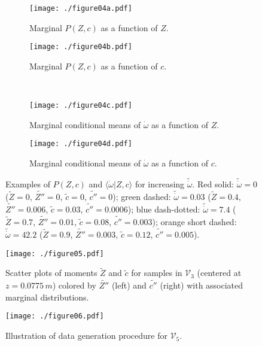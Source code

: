 \documentclass[review]{elsarticle}
\newcommand{\wt}[1]{\widetilde{#1}}
\begin{document}
\clearpage\newpage
\begin{figure}[!tbp]%
  \centering%
  \begin{subfigure}[t]{0.48\textwidth}%
    \texttt{[image: ./figure04a.pdf]}%
    \caption{Marginal $P(Z,c)$ as a function of $Z$.}%
  \end{subfigure}\hfill%
  \begin{subfigure}[t]{0.48\textwidth}%
    \texttt{[image: ./figure04b.pdf]}%
    \caption{Marginal $P(Z,c)$ as a function of $c$.}%
  \end{subfigure}\\%
  \begin{subfigure}[t]{0.48\textwidth}%
    \texttt{[image: ./figure04c.pdf]}%
    \caption{Marginal conditional means of $\dot{\omega}$ as a function of $Z$.}%
  \end{subfigure}\hfill%
  \begin{subfigure}[t]{0.48\textwidth}%
    \texttt{[image: ./figure04d.pdf]}%
    \caption{Marginal conditional means of $\dot{\omega}$ as a function of $c$.}%
  \end{subfigure}%
  \caption{Examples of $P(Z,c)$ and $\langle \dot{\omega} | Z, c \rangle$ for increasing $\wt{\dot{\omega}}$. Red solid: $\wt{\dot{\omega}} = 0$ ($\wt{Z} = 0$, $\wt{Z''} = 0$, $\wt{c} = 0$, $\wt{c''} = 0$); green dashed: $\wt{\dot{\omega}} = 0.03$ ($\wt{Z}  =0.4$, $\wt{Z''}=0.006$, $\wt{c}  =0.03$, $\wt{c''}=0.0006$); blue dash-dotted: $\wt{\dot{\omega}} = 7.4$ ($\wt{Z}  =0.7$, $\wt{Z''}=0.01$, $\wt{c}  =0.08$, $\wt{c''}=0.003$); orange short dashed: $\wt{\dot{\omega}} = 42.2$ ($\wt{Z}  =0.9$, $\wt{Z''}=0.003$, $\wt{c}  =0.12$, $\wt{c''}=0.005$).}\label{fig:pdfs}%
\end{figure}%

\clearpage\newpage
\begin{figure}[!tbp]%
  \centering%
  \texttt{[image: ./figure05.pdf]}%
  \caption{Scatter plots of moments $\wt{Z}$ and $\wt{c}$ for samples in $\mathcal{V}_3$ (centered at $z=0.0775\,\unit{m}$) colored by $\wt{Z''}$ (left) and $\wt{c''}$ (right) with associated marginal distributions.}\label{fig:inputs}%
\end{figure}%

\clearpage\newpage
\begin{figure}[!tbp]%
  \centering%
  \texttt{[image: ./figure06.pdf]}\\%
  \caption{Illustration of data generation procedure for $\mathcal{V}_5$.}\label{fig:gen_data}%
\end{figure}%
\end{document}
